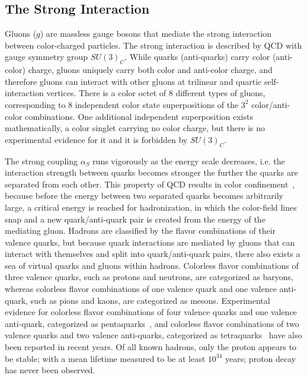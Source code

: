 \subsection{The Strong Interaction}
Gluons ($g$) are massless gauge bosons that mediate the strong interaction between color-charged particles.
The strong interaction is described by QCD with gauge symmetry group $SU(3)_C$.
While quarks (anti-quarks) carry color (anti-color) charge, gluons uniquely carry both color and anti-color charge, and therefore gluons can interact with other gluons at trilinear and quartic self-interaction vertices.
There is a color octet of 8 different types of gluons, corresponding to 8 independent color state superpositions of the $3^2$ color/anti-color combinations.
One additional independent superposition exists mathematically, a color singlet carrying no color charge, but there is no experimental evidence for it and it is forbidden by $SU(3)_C$.

The strong coupling $\alpha_S$ runs vigorously as the energy scale decreases, i.e. the interaction strength between quarks becomes stronger the further the quarks are separated from each other.
This property of QCD results in color confinement~\cite{FRITZSCH1973365}, because before the energy between two separated quarks becomes arbitrarily large, a critical energy is reached for hadronization, in which the color-field lines snap and a new quark/anti-quark pair is created from the energy of the mediating gluon.
Hadrons are classified by the flavor combinations of their valence quarks, but because quark interactions are mediated by gluons that can interact with themselves and split into quark/anti-quark pairs, there also exists a sea of virtual quarks and gluons within hadrons.
Colorless flavor combinations of three valence quarks, such as protons and neutrons, are categorized as baryons, whereas colorless flavor combinations of one valence quark and one valence anti-quark, such as pions and kaons, are categorized as mesons.
Experimental evidence for colorless flavor combinations of four valence quarks and one valence anti-quark, categorized as pentaquarks~\cite{PhysRevLett.115.072001}, and colorless flavor combinations of two valence quarks and two valence anti-quarks, categorized as tetraquarks~\cite{PhysRevLett.110.252002} have also been reported in recent years.
Of all known hadrons, only the proton appears to be stable; with a mean lifetime measured to be at least $10^{34}$ years; proton decay has never been observed.

